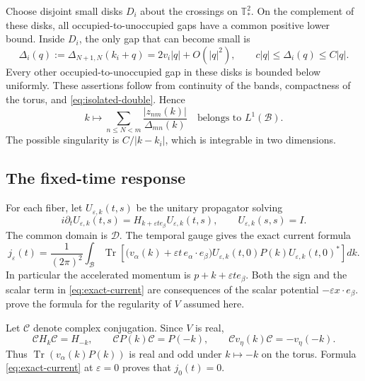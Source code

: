 \documentclass[11pt,a4paper]{article}
\newcommand{\B}{\mathcal B}
\newcommand{\T}{\mathbb T_{\!*}^{2}}
\newcommand{\DD}{\mathscr D}
\newcommand{\cB}{\frac{1}{(2\pi)^2}}
\DeclareMathOperator{\Tr}{Tr}
\numberwithin{equation}{section}
\begin{document}
Choose disjoint small disks $D_i$ about the crossings on $\T$. On the
complement of these disks, all occupied-to-unoccupied gaps have a common
positive lower bound. Inside $D_i$, the only gap that can become small
is
\begin{equation}\label{eq:small-gap}
 \Delta_i(q):=\Delta_{N+1,N}(k_i+q)
 =2v_i|q|+O(|q|^2),\qquad
 c|q|\leq\Delta_i(q)\leq C|q|.
\end{equation}
Every other occupied-to-unoccupied gap in these disks is bounded below
uniformly. These assertions follow from continuity of the bands,
compactness of the torus, and \eqref{eq:isolated-double}. Hence
\begin{equation}\label{eq:inverse-gap-integrable}
 k\longmapsto
 \sum_{n\leq N<m}\frac{|z_{nm}(k)|}{\Delta_{mn}(k)}
 \quad\text{belongs to }L^1(\B).
\end{equation}
The possible singularity is $C/|k-k_i|$, which is integrable in two
dimensions.

\subsection{The fixed-time response}

For each fiber, let $U_{\varepsilon,k}(t,s)$ be the unitary propagator
solving
\begin{equation}\label{eq:fiber-evolution}
 i\partial_t U_{\varepsilon,k}(t,s)
 =H_{k+\varepsilon t e_\beta}U_{\varepsilon,k}(t,s),
 \qquad U_{\varepsilon,k}(s,s)=I.
\end{equation}
The common domain is $\DD$. The temporal gauge gives the exact current
formula
\begin{equation}\label{eq:exact-current}
 j_\varepsilon(t)=\cB\int_\B
 \Tr\!\left[
 \bigl(v_\alpha(k)+\varepsilon t\,e_\alpha\cdot e_\beta\bigr)
 U_{\varepsilon,k}(t,0)P(k)U_{\varepsilon,k}(t,0)^*
 \right]dk.
\end{equation}
In particular the accelerated momentum is $p+k+\varepsilon t e_\beta$.
Both the sign and the scalar term in \eqref{eq:exact-current} are
consequences of the scalar potential $-\varepsilon x\cdot e_\beta$.
 prove the formula for the regularity of
$V$ assumed here.

Let $\mathcal C$ denote complex conjugation. Since $V$ is real,
\begin{equation}\label{eq:time-reversal}
 \mathcal C H_k\mathcal C=H_{-k},\qquad
 \mathcal C P(k)\mathcal C=P(-k),\qquad
 \mathcal C v_\eta(k)\mathcal C=-v_\eta(-k).
\end{equation}
Thus $\Tr(v_\alpha(k)P(k))$ is real and odd under $k\mapsto-k$ on the
torus. Formula \eqref{eq:exact-current} at $\varepsilon=0$ proves that
$j_0(t)=0$.
\end{document}
